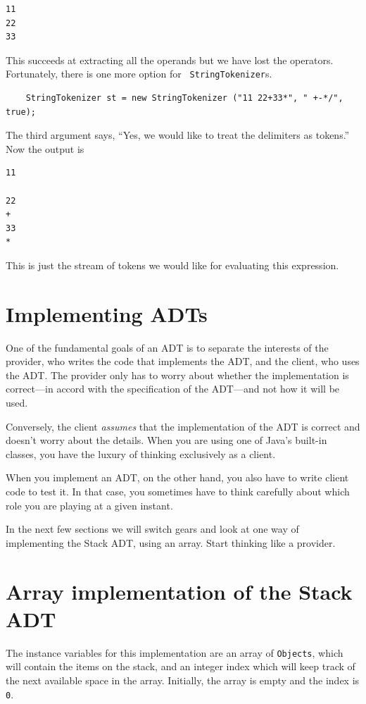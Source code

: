 \documentclass[12pt]{book}
\theoremstyle{exercise}
\begin{document}
\begin{verbatim}
11
22
33
\end{verbatim}
%
This succeeds at extracting all the operands but we have lost the
operators.  Fortunately, there is one more option for {\tt
StringTokenizer}s.

\begin{verbatim}
    StringTokenizer st = new StringTokenizer ("11 22+33*", " +-*/", true);
\end{verbatim}
%
The third argument says, ``Yes, we would like to treat the delimiters
as tokens.''  Now the output is

\begin{verbatim}
11
 
22
+
33
*
\end{verbatim}
%
This is just the stream of tokens we would like for evaluating
this expression.


\section {Implementing ADTs}

One of the fundamental goals of an ADT is to separate the
interests of the provider, who writes the code that implements
the ADT, and the client, who uses the ADT.
The provider only has to worry
about whether the implementation is correct---in accord
with the specification of the ADT---and not how it will be used.

Conversely, the client {\em assumes} that the implementation of the
ADT is correct and doesn't worry about the details.  When you
are using one of Java's built-in classes, you have the luxury
of thinking exclusively as a client.

When you implement an ADT, on the other hand, you also have
to write client code to test it.  In that case, you sometimes
have to think carefully about which role you are playing at
a given instant.

In the next few sections we will switch gears and look at one way of
implementing the Stack ADT, using an array.  Start thinking like a
provider.


\section {Array implementation of the Stack ADT}
\label{arraystack}

The instance variables for this implementation are
an array of {\tt Objects}, which will contain the items on
the stack, and an integer index which will keep track of
the next available space in the array.
Initially, the array is empty and the index is {\tt 0}.
\end{document}
